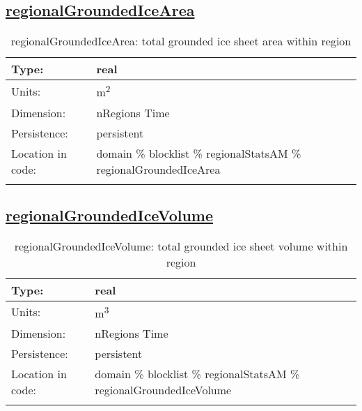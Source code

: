 \subsection[regionalGroundedIceArea]{\hyperref[sec:var_tab_regionalStatsAM]{regionalGroundedIceArea}}
\label{subsec:var_sec_regionalStatsAM_regionalGroundedIceArea}
\begin{center}
\begin{longtable}{| p{2.0in} | p{4.0in} |}
        \hline 
        Type: & real \\
        \hline 
        Units: & \si{m^2} \\
        \hline 
        Dimension: & nRegions Time \\
        \hline 
        Persistence: & persistent \\
        \hline 
         Location in code: & domain \% blocklist \% regionalStatsAM \% regionalGroundedIceArea \\
         \hline 
    \caption{regionalGroundedIceArea: total grounded ice sheet area within region}
\end{longtable}
\end{center}
\subsection[regionalGroundedIceVolume]{\hyperref[sec:var_tab_regionalStatsAM]{regionalGroundedIceVolume}}
\label{subsec:var_sec_regionalStatsAM_regionalGroundedIceVolume}
\begin{center}
\begin{longtable}{| p{2.0in} | p{4.0in} |}
        \hline 
        Type: & real \\
        \hline 
        Units: & \si{m^3} \\
        \hline 
        Dimension: & nRegions Time \\
        \hline 
        Persistence: & persistent \\
        \hline 
         Location in code: & domain \% blocklist \% regionalStatsAM \% regionalGroundedIceVolume \\
         \hline 
    \caption{regionalGroundedIceVolume: total grounded ice sheet volume within region}
\end{longtable}
\end{center}
